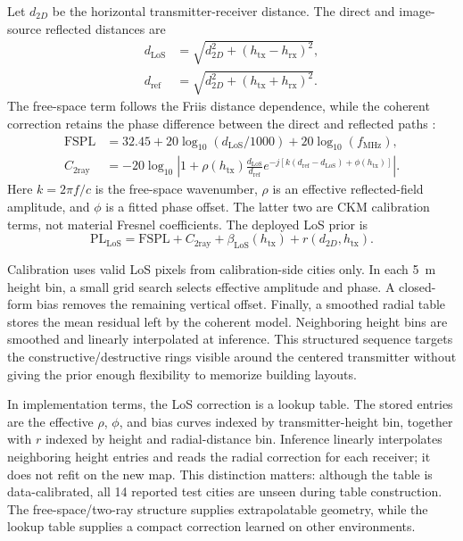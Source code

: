 \documentclass[10pt,conference]{IEEEtran}
\begin{document}
Let $d_{2D}$ be the horizontal transmitter-receiver distance. The direct and
image-source reflected distances are
\begin{equation}
\begin{aligned}
d_{\mathrm{LoS}}&=\sqrt{d_{2D}^2+(h_{\mathrm{tx}}-h_{\mathrm{rx}})^2},\\
d_{\mathrm{ref}}&=\sqrt{d_{2D}^2+(h_{\mathrm{tx}}+h_{\mathrm{rx}})^2}.
\end{aligned}
\label{eq:distances}
\end{equation}
The free-space term follows the Friis distance dependence, while the coherent
correction retains the phase difference between the direct and reflected paths
\cite{rappaport,goldsmith,wocc2021}:
\begin{align}
\mathrm{FSPL}&=32.45+20\log_{10}(d_{\mathrm{LoS}}/1000)
+20\log_{10}(f_{\mathrm{MHz}}),\label{eq:fspl}\\
C_{\mathrm{2ray}}&=-20\log_{10}\left|1+\rho(h_{\mathrm{tx}})
\frac{d_{\mathrm{LoS}}}{d_{\mathrm{ref}}}
e^{-j[k(d_{\mathrm{ref}}-d_{\mathrm{LoS}})+\phi(h_{\mathrm{tx}})]}\right|.
\label{eq:tworay}
\end{align}
Here $k=2\pi f/c$ is the free-space wavenumber, $\rho$ is an effective
reflected-field amplitude, and $\phi$ is a fitted phase offset. The latter two
are CKM calibration terms, not material Fresnel coefficients. The deployed
LoS prior is
\begin{equation}
\mathrm{PL}_{\mathrm{LoS}}=\mathrm{FSPL}+C_{\mathrm{2ray}}
+\beta_{\mathrm{LoS}}(h_{\mathrm{tx}})+r(d_{2D},h_{\mathrm{tx}}).
\label{eq:los}
\end{equation}

Calibration uses valid LoS pixels from calibration-side cities only. In each
\SI{5}{m} height bin, a small grid search selects effective amplitude and
phase. A closed-form bias removes the remaining vertical offset. Finally, a
smoothed radial table stores the mean residual left by the coherent model.
Neighboring height bins are smoothed and linearly interpolated at inference.
This structured sequence targets the constructive/destructive rings visible
around the centered transmitter without giving the prior enough flexibility to
memorize building layouts.

In implementation terms, the LoS correction is a lookup table. The stored
entries are the effective $\rho$, $\phi$, and bias curves indexed by
transmitter-height bin, together with $r$ indexed by height and radial-distance
bin. Inference linearly interpolates neighboring height entries and reads the
radial correction for each receiver; it does not refit on the new map. This
distinction matters: although the table is data-calibrated, all 14 reported
test cities are unseen during table construction. The free-space/two-ray
structure supplies extrapolatable geometry, while the lookup table supplies a
compact correction learned on other environments.
\end{document}

